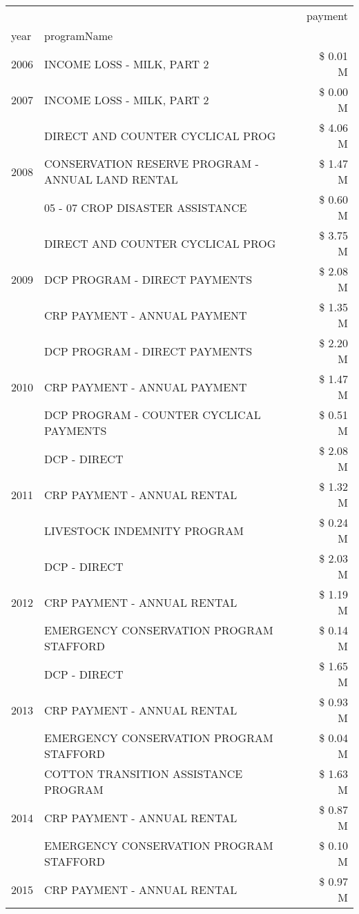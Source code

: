 \begin{tabular}{llr}
\toprule
 &  & payment \\
year & programName &  \\
\midrule
2006 & INCOME LOSS - MILK, PART 2 & \$ 0.01 M \\
\cline{1-3}
2007 & INCOME LOSS - MILK, PART 2 & \$ 0.00 M \\
\cline{1-3}
\multirow[t]{3}{*}{2008} & DIRECT AND COUNTER CYCLICAL PROG & \$ 4.06 M \\
 & CONSERVATION RESERVE PROGRAM - ANNUAL LAND RENTAL & \$ 1.47 M \\
 & 05 - 07 CROP DISASTER ASSISTANCE & \$ 0.60 M \\
\cline{1-3}
\multirow[t]{3}{*}{2009} & DIRECT AND COUNTER CYCLICAL PROG & \$ 3.75 M \\
 & DCP PROGRAM - DIRECT PAYMENTS & \$ 2.08 M \\
 & CRP PAYMENT - ANNUAL PAYMENT & \$ 1.35 M \\
\cline{1-3}
\multirow[t]{3}{*}{2010} & DCP PROGRAM - DIRECT PAYMENTS & \$ 2.20 M \\
 & CRP PAYMENT - ANNUAL PAYMENT & \$ 1.47 M \\
 & DCP PROGRAM - COUNTER CYCLICAL PAYMENTS & \$ 0.51 M \\
\cline{1-3}
\multirow[t]{3}{*}{2011} & DCP - DIRECT & \$ 2.08 M \\
 & CRP PAYMENT - ANNUAL RENTAL & \$ 1.32 M \\
 & LIVESTOCK INDEMNITY PROGRAM & \$ 0.24 M \\
\cline{1-3}
\multirow[t]{3}{*}{2012} & DCP - DIRECT & \$ 2.03 M \\
 & CRP PAYMENT - ANNUAL RENTAL & \$ 1.19 M \\
 & EMERGENCY CONSERVATION PROGRAM STAFFORD & \$ 0.14 M \\
\cline{1-3}
\multirow[t]{3}{*}{2013} & DCP - DIRECT & \$ 1.65 M \\
 & CRP PAYMENT - ANNUAL RENTAL & \$ 0.93 M \\
 & EMERGENCY CONSERVATION PROGRAM STAFFORD & \$ 0.04 M \\
\cline{1-3}
\multirow[t]{3}{*}{2014} & COTTON TRANSITION ASSISTANCE PROGRAM & \$ 1.63 M \\
 & CRP PAYMENT - ANNUAL RENTAL & \$ 0.87 M \\
 & EMERGENCY CONSERVATION PROGRAM STAFFORD & \$ 0.10 M \\
\cline{1-3}
\multirow[t]{3}{*}{2015} & CRP PAYMENT - ANNUAL RENTAL & \$ 0.97 M \\

\end{tabular}
